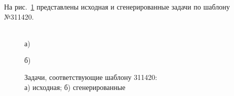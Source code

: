  
На рис.~\ref{ris:311420} представлены исходная и сгенерированные задачи по шаблону №311420.

\begin{figure}[h]
\begin{minipage}[h]{0.8\linewidth}
 \\а)
\end{minipage}
\vfill
\begin{minipage}[h]{0.95\linewidth}
 б) \\
\end{minipage}
\caption{Задачи, соответствующие шаблону 311420:
\\
а) исходная; б) сгенерированные}
\label{ris:311420}
\end{figure}
